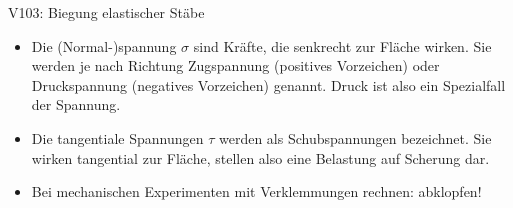 \begin{Versuch}{V103: Biegung elastischer Stäbe}
        \begin{Merke}
        	\begin{itemize}
				\item Die (Normal-)spannung $\sigma$ sind Kräfte, die senkrecht zur Fläche wirken. 
				Sie werden je nach Richtung Zugspannung (positives Vorzeichen) oder Druckspannung (negatives Vorzeichen) genannt. 
				Druck ist also ein Spezialfall der Spannung.
				\item Die tangentiale Spannungen $\tau$ werden als Schubspannungen bezeichnet. 
				Sie wirken tangential zur Fläche, stellen also eine Belastung auf Scherung dar.
				\item Bei mechanischen Experimenten mit Verklemmungen rechnen: abklopfen!
        	\end{itemize}
		\end{Merke}
    \end{Versuch}
    
